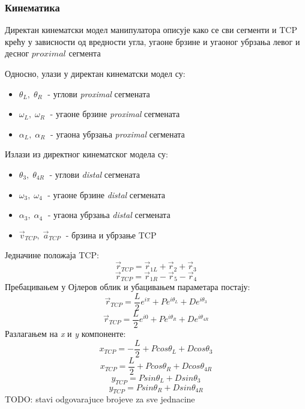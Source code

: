 \documentclass[12pt]{article}
\begin{document}
\subsubsection{Кинематика}
Директан кинематски модел манипулатора описује како се сви сегменти и TCP крећу у зависности од вредности угла, угаоне брзине и угаоног убрзања левог и десног $proximal$ сегмента

Односно, улази у директан кинематски модел су:
\begin{itemize}
    \item $\theta_L, \; \theta_R\;$ - углови \textit{proximal} сегмената
    \item $\omega_L, \; \omega_R\;$ - угаоне брзине \textit{proximal} сегмената
    \item $\alpha_L, \; \alpha_R\;$ - угаона убрзања \textit{proximal} сегмената
\end{itemize}
Излази из директног кинематског модела су:
\begin{itemize}
    \item $\theta_3, \; \theta_{4R}\;$ - углови \textit{distal} сегмената
    \item $\omega_3, \; \omega_4\;$ - угаоне брзине \textit{distal} сегмената
    \item $\alpha_3, \; \alpha_4\;$ - угаона убрзања \textit{distal} сегмената
    \item $\vec{v}_{TCP},\; \vec{a}_{TCP}\;$ - брзина и убрзање TCP
\end{itemize}

Једначине положаја TCP:
\begin{equation}
    \vec{r}_{TCP} = \vec{r}_{1L} + \vec{r}_2 + \vec{r}_3
\end{equation}
\begin{equation}
    \vec{r}_{TCP} = \vec{r}_{1R} - \vec{r}_5 - \vec{r}_4
\end{equation}
Пребацивањем у Ојлеров облик и убацивањем параметара постају:
\begin{equation}
    \vec{r}_{TCP} = \dfrac{L}{2}e^{i\pi} + Pe^{i\theta_L} + De^{i\theta_3}
\end{equation}
\begin{equation}
    \vec{r}_{TCP} = \dfrac{L}{2}e^{i0} + Pe^{i\theta_R} + De^{i\theta_{4R}}
\end{equation}
Разлагањем на \textit{x} и \textit{y} компоненте:
\begin{equation}
    x_{TCP} = -\dfrac{L}{2} + Pcos\theta_L + Dcos\theta_3
\end{equation}
\begin{equation}
    x_{TCP} = \dfrac{L}{2} + Pcos\theta_R + Dcos\theta_{4R}
\end{equation}
\begin{equation}
    y_{TCP} = Psin\theta_L + Dsin\theta_3
\end{equation}
\begin{equation}
    y_{TCP} = Psin\theta_R + Dsin\theta_{4R}
\end{equation}
TODO: stavi odgovarajuce brojeve za sve jednacine
\end{document}
